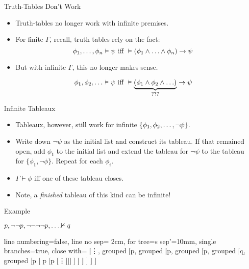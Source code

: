 \begin{frame}{Truth-Tables Don't Work}
	
\begin{itemize}
\itemsep=16pt

\item Truth-tables no longer work with infinite premises.
		
\medskip
		
\item For finite $\Gamma$, recall, truth-tables rely on the fact: 
\[\phi_1,\mathellipsis, \phi_n\vDash \psi\text{ iff }\vDash (\phi_1\land\mathellipsis\land\phi_n)\to\psi\]
				
\item But with infinite $\Gamma$, this no longer makes sense.
				
\[\phi_1,\phi_2,\mathellipsis\vDash \psi\text{ iff }\vDash \underbrace{(\phi_1\land\phi_2\land\mathellipsis)}_{???}\to\psi\]
			
\end{itemize}

\end{frame}

\begin{frame}{Infinite Tableaux}

\begin{itemize}
\itemsep=16pt

	
		\item Tableaux, however, still work for infinite $\{\phi_1,\phi_2,\mathellipsis,\neg\psi\}$.
		
		\item Write down $\neg\psi$ as the initial list and construct its tableau.
		If that remained open, add $\phi_1$ to the initial list and extend the tableau for $\neg\psi$ to the tableau for $\{\phi_1,\neg\phi\}$.
		Repeat for each $\phi_i$.
		
		\item $\Gamma\vdash\phi$ iff one of these tableau closes.
		
		\item Note, a \emph{finished} tableau of this kind can be infinite!
	
	\end{itemize}

\end{frame}

\begin{frame}{Example}

\begin{center}

$p, \neg\neg p, \neg\neg\neg\neg p, \mathellipsis\nvdash q$

\bigskip\bigskip

				\begin{prooftree}
					{
					line numbering=false,
					line no sep= 2cm,
					for tree={s sep'=10mm},
					single branches=true,
					close with=\xmark
					}
					[\vdots, grouped [\neg\neg\neg\neg p, grouped [\neg\neg p, grouped [p, grouped [\neg q, grouped [p [ \neg \neg p [p [\vdots ]]] ] ] ]  ] ] ]
					\end{prooftree}
				\end{center}

\end{frame}

